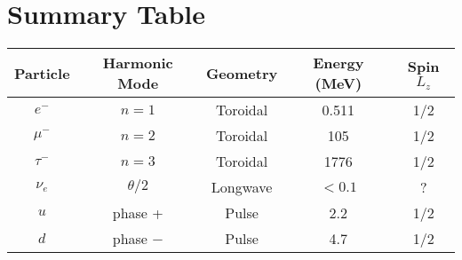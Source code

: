 \documentclass[12pt]{article}
\begin{document}
\section*{Summary Table}
\begin{tabular}{|c|c|c|c|c|}
\hline
Particle & Harmonic Mode & Geometry & Energy (MeV) & Spin $L_z$ \\
\hline
$e^-$   & $n=1$          & Toroidal & 0.511         & 1/2         \\
$\mu^-$ & $n=2$          & Toroidal & 105           & 1/2         \\
$\tau^-$& $n=3$          & Toroidal & 1776          & 1/2         \\
$\nu_e$ & $\theta/2$     & Longwave & $<0.1$        & ?           \\
$u$     & phase +        & Pulse    & 2.2           & 1/2         \\
$d$     & phase −        & Pulse    & 4.7           & 1/2         \\
\hline
\end{tabular}
\end{document}
